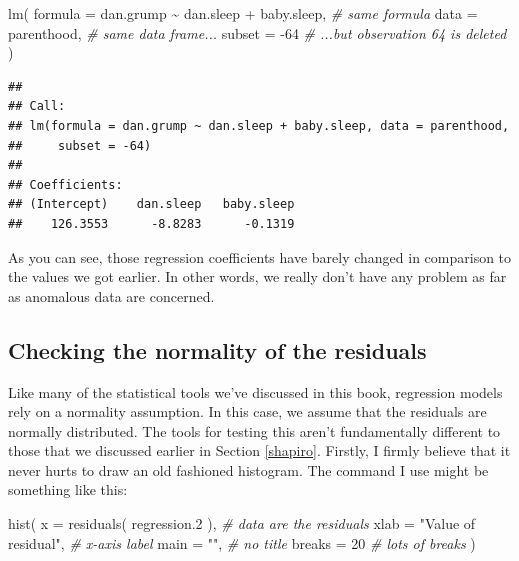 \documentclass[
]{book}
\newenvironment{Shaded}{\begin{snugshade}}{\end{snugshade}}
\newcommand{\AttributeTok}[1]{\textcolor[rgb]{0.77,0.63,0.00}{#1}}
\newcommand{\CommentTok}[1]{\textcolor[rgb]{0.56,0.35,0.01}{\textit{#1}}}
\newcommand{\DecValTok}[1]{\textcolor[rgb]{0.00,0.00,0.81}{#1}}
\newcommand{\FloatTok}[1]{\textcolor[rgb]{0.00,0.00,0.81}{#1}}
\newcommand{\FunctionTok}[1]{\textcolor[rgb]{0.00,0.00,0.00}{#1}}
\newcommand{\NormalTok}[1]{#1}
\newcommand{\SpecialCharTok}[1]{\textcolor[rgb]{0.00,0.00,0.00}{#1}}
\newcommand{\StringTok}[1]{\textcolor[rgb]{0.31,0.60,0.02}{#1}}
\begin{document}
\begin{Shaded}
\begin{Highlighting}[]
\FunctionTok{lm}\NormalTok{( }\AttributeTok{formula =}\NormalTok{ dan.grump }\SpecialCharTok{\textasciitilde{}}\NormalTok{ dan.sleep }\SpecialCharTok{+}\NormalTok{ baby.sleep,  }\CommentTok{\# same formula}
     \AttributeTok{data =}\NormalTok{ parenthood,       }\CommentTok{\# same data frame...}
     \AttributeTok{subset =} \SpecialCharTok{{-}}\DecValTok{64}             \CommentTok{\# ...but observation 64 is deleted}
\NormalTok{ )}
\end{Highlighting}
\end{Shaded}

\begin{verbatim}
## 
## Call:
## lm(formula = dan.grump ~ dan.sleep + baby.sleep, data = parenthood, 
##     subset = -64)
## 
## Coefficients:
## (Intercept)    dan.sleep   baby.sleep  
##    126.3553      -8.8283      -0.1319
\end{verbatim}

As you can see, those regression coefficients have barely changed in comparison to the values we got earlier. In other words, we really don't have any problem as far as anomalous data are concerned.

\hypertarget{regressionnormality}{%
\subsection{Checking the normality of the residuals}\label{regressionnormality}}

Like many of the statistical tools we've discussed in this book, regression models rely on a normality assumption. In this case, we assume that the residuals are normally distributed. The tools for testing this aren't fundamentally different to those that we discussed earlier in Section \ref{shapiro}. Firstly, I firmly believe that it never hurts to draw an old fashioned histogram. The command I use might be something like this:

\begin{Shaded}
\begin{Highlighting}[]
 \FunctionTok{hist}\NormalTok{( }\AttributeTok{x =} \FunctionTok{residuals}\NormalTok{( regression}\FloatTok{.2}\NormalTok{ ),   }\CommentTok{\# data are the residuals}
       \AttributeTok{xlab =} \StringTok{"Value of residual"}\NormalTok{,      }\CommentTok{\# x{-}axis label}
       \AttributeTok{main =} \StringTok{""}\NormalTok{,                       }\CommentTok{\# no title }
       \AttributeTok{breaks =} \DecValTok{20}                      \CommentTok{\# lots of breaks}
\NormalTok{ )}
\end{Highlighting}
\end{Shaded}
\end{document}

